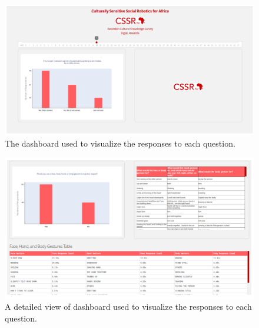 \documentclass{CSSRforAfrica}
\begin{document}
\begin{figure}[t]
\begin{center}
\includegraphics[width=120mm,angle=0]{images/dashboard1.png}
\end{center}
\vspace{-5mm}
\caption{The dashboard used to visualize the responses to each question.}
\label{fig:dashboard1}       
\end{figure}

\begin{figure}[tb]
\begin{center}
\includegraphics[width=120mm,angle=0]{images/dashboard2.png}
\end{center}
\vspace{-5mm}
\caption{A detailed view of dashboard used to visualize the responses to each question.}
\label{fig:dashboard2}       
\end{figure}
\end{document}
